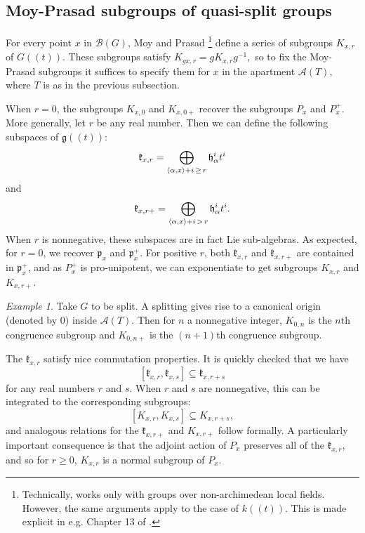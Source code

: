 \documentclass[12pt]{article}
\theoremstyle{remark}
\newtheorem{example}[theorem]{Example}
\begin{document}
\subsection{Moy-Prasad subgroups of quasi-split groups}\label{ss:moyprasad}

For every point $x$ in $\mathcal{B}(G)$, Moy and Prasad \cite{MP1}\footnote{Technically, \cite{MP1} works only with groups over non-archimedean local fields. However, the same arguments apply to the case of $k((t))$. This is made explicit in e.g. Chapter 13 of \cite{kalethaprasad}.} define a series of subgroups $K_{x,r}$ of $G((t))$. These subgroups satisfy $K_{gx,r}=gK_{x,r}g^{-1},$ so to fix the Moy-Prasad subgroups it suffices to specify them for $x$ in the apartment $\mathcal{A}(T)$, where $T$ is as in the previous subsection.

When $r=0$, the subgroups $K_{x,0}$ and $K_{x,0+}$ recover the subgroups $P_x$ and $P_x^+$. More generally, let $r$ be any real number. Then we can define the following subspaces of $\mathfrak{g}((t))$:
\[
\mathfrak{k}_{x,r}=\displaystyle\bigoplus_{\langle\alpha,x\rangle+i\thinspace\geq\thinspace r}\mathfrak{h}_{\alpha}^it^i
\]
and
\[
\mathfrak{k}_{x,r+}=\displaystyle\bigoplus_{\langle\alpha,x\rangle+i\thinspace>\thinspace r}\mathfrak{h}_{\alpha}^it^i.
\]
When $r$ is nonnegative, these subspaces are in fact Lie sub-algebras. As expected, for $r=0$, we recover $\mathfrak{p}_x$ and $\mathfrak{p}_x^+$. For positive $r$, both $\mathfrak{k}_{x,r}$ and $\mathfrak{k}_{x,r+}$ are contained in $\mathfrak{p}_x^+$, and as $P_x^+$ is pro-unipotent, we can exponentiate to get subgroups $K_{x,r}$ and $K_{x,r+}$. 

\begin{example}
Take $G$ to be split. A splitting gives rise to a canonical origin (denoted by $0$) inside $\mathcal{A}(T).$ Then for $n$ a nonnegative integer, $K_{0,n}$ is the $n$th congruence subgroup and $K_{0,n+}$ is the $(n+1)$th congruence subgroup.
\end{example}

The $\mathfrak{k}_{x,r}$ satisfy nice commutation properties. It is quickly checked that we have
\[
[\mathfrak{k}_{x,r},\mathfrak{k}_{x,s}]\subseteq\mathfrak{k}_{x,r+s}
\]
for any real numbers $r$ and $s$. When $r$ and $s$ are nonnegative, this can be integrated to the corresponding subgroups:
\[
[K_{x,r},K_{x,s}]\subseteq K_{x,r+s},
\]
and analogous relations for the $\mathfrak{k}_{x,r+}$ and $K_{x,r+}$ follow formally. A particularly important consequence is that the adjoint action of $P_x$ preserves all of the $\mathfrak{k}_{x,r}$, and so for $r\geq 0$, $K_{x,r}$ is a normal subgroup of $P_x$.
\end{document}

